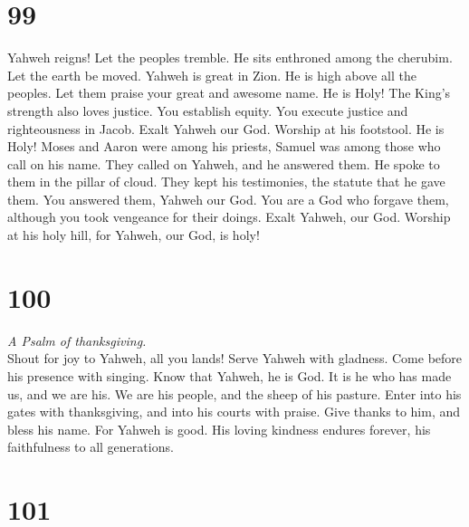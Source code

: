 \hypertarget{section-98}{%
\section{99}\label{section-98}}

 Yahweh reigns! Let the peoples tremble. He sits enthroned
among the cherubim. Let the earth be moved.  Yahweh is
great in Zion. He is high above all the peoples.  Let them
praise your great and awesome name. He is Holy!  The
King's strength also loves justice. You establish equity. You execute
justice and righteousness in Jacob.  Exalt Yahweh our God.
Worship at his footstool. He is Holy!  Moses and Aaron
were among his priests, Samuel was among those who call on his name.
They called on Yahweh, and he answered them.  He spoke to
them in the pillar of cloud. They kept his testimonies, the statute that
he gave them.  You answered them, Yahweh our God. You are
a God who forgave them, although you took vengeance for their doings.
 Exalt Yahweh, our God. Worship at his holy hill, for
Yahweh, our God, is holy!

\hypertarget{section-99}{%
\section{100}\label{section-99}}

\emph{A Psalm of thanksgiving.}\\
 Shout for joy to Yahweh, all you lands! 
Serve Yahweh with gladness. Come before his presence with singing.
 Know that Yahweh, he is God. It is he who has made us,
and we are his. We are his people, and the sheep of his pasture.
 Enter into his gates with thanksgiving, and into his
courts with praise. Give thanks to him, and bless his name.
 For Yahweh is good. His loving kindness endures forever,
his faithfulness to all generations.

\hypertarget{section-100}{%
\section{101}\label{section-100}}

